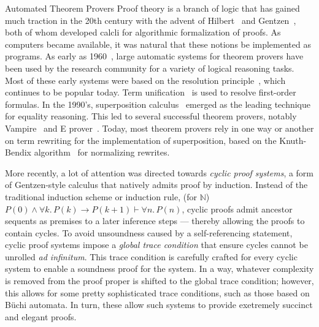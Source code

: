 \begin{paragraph}{Automated Theorem Provers}
Proof theory is a branch of logic that has gained much traction in the 20th century with the advent of Hilbert~\cite{Book1928:Hilbert} and Gentzen~\cite{j1935:Gentzen},
both of whom developed calcli for algorithmic formalization of proofs.
As computers became available, it was natural that these notions be implemented as programs.
As early as 1960~\cite{otter}, large automatic systems for theorem provers have been used by the research community for a variety of logical reasoning tasks.
Most of these early systems were based on the resolution principle~\cite{robinson1965}, which continues to be popular today.
Term unification~\cite{robinson1965} is used to resolve first-order formulas.
In the 1990's, superposition calculus~\cite{LPAR1992:Bachmair} emerged as the leading technique for equality reasoning.
This led to several successful theorem provers, notably Vampire~\cite{JAR1995:Voronkov} and E prover~\cite{AIC2002:Schulz}.
Today, most theorem provers rely in one way or another on term rewriting for the implementation of superposition, based on the Knuth-Bendix algorithm~\cite{knuth-bendix} for normalizing rewrites.

More recently, a lot of attention was directed towards \emph{cyclic proof systems}, a form of Gentzen-style calculus that natively admits proof by induction.
Instead of the traditional induction scheme or induction rule, \eg (for $\mathbb{N}$) $P(0)\land \forall k.\,P(k)\to P(k+1) \vdash \forall n.\,P(n)$,
cyclic proofs admit ancestor sequents as premises to a later inference steps --- thereby allowing the proofs to contain cycles.
To avoid unsoundness caused by a self-referencing statement, cyclic proof systems impose a \emph{global trace condition} that ensure cycles cannot be unrolled \textit{ad infinitum}.
This trace condition is carefully crafted for every cyclic system to enable a soundness proof for the system.
In a way, whatever complexity is removed from the proof proper is shifted to the global trace condition;
however, this allows for some pretty sophisticated trace conditions, such as those based on B\"uchi automata.
In turn, these allow such systems to provide exetremely succinct and elegant proofs.
\end{paragraph}

